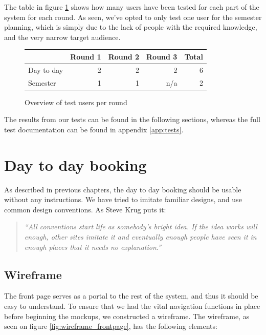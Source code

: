 The table in figure \ref{fig:usa_users} shows how many users have been tested for each part of the system for each round. As seen, we've opted to only test one user for the semester planning, which is simply due to the lack of people with the required knowledge, and the very narrow target audience.

\begin{figure}[htb]
\begin{center}
\leavevmode
	\begin{tabular}{|l|r|r|r||r|}
		\hline
		 & Round 1 & Round 2 & Round 3 & Total \\ \hline
		Day to day & 2 & 2 & 2 & 6\\ \hline
		Semester & 1 & 1 & n/a & 2 \\ \hline
	\end{tabular}
\end{center}
\caption{Overview of test users per round}
\label{fig:usa_users}
\end{figure}

The results from our tests can be found in the following sections, whereas the full test documentation can be found in appendix \ref{app:tests}.

\section{Day to day booking}
\label{sec:day_to_day_booking_ui}
As described in previous chapters, the day to day booking should be usable without any instructions. We have tried to imitate familiar designs, and use common design conventions. As Steve Krug puts it\cite{steve}: 
\begin{quotation}
\emph{``All conventions start life as somebody's bright idea. If the idea works will enough, other sites imitate it and eventually enough people have seen it in enough places that it needs no explanation.''}
\end{quotation}

\subsection{Wireframe}
\label{subsec:wireframe}
The front page serves as a portal to the rest of the system, and thus it should be easy to understand. To ensure that we had the vital navigation functions in place before beginning the mockups, we constructed a wireframe\cite{garrett}. The wireframe, as seen on figure \ref{fig:wireframe_frontpage}, has the following elements:

